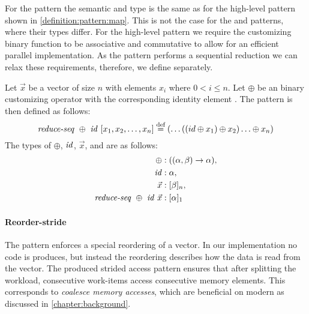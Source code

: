 For the \mapSeq pattern the semantic and type is the same as for the high-level \map pattern shown in \autoref{definition:pattern:map}.
This is not the case for the \reduceSeq and \reduce patterns, where their types differ.
For the high-level \reduce pattern we require the customizing binary function to be associative and commutative to allow for an efficient parallel implementation.
As the \reduceSeq pattern performs a sequential reduction we can relax these requirements, therefore, we define \reduceSeq separately.
\begin{definition}
  \label{definition:pattern:reduceSeq}
  Let $\vec{x}$ be a vector of size $n$ with elements $x_i$ where $0 < i \leq n$.
  Let $\oplus$ be an binary customizing operator with the corresponding identity element \id.
  The \reduceSeq pattern is then defined as follows:
  \begin{equation*}
    \text{\textit{reduce-seq}}\ \oplus\ \text{\textit{id}}\ [x_1, x_2, \dots, x_n]
      \stackrel{\textrm{\scriptsize def}}{=} (\dots((id \oplus x_1) \oplus x_2) \ldots \oplus x_n)
  \end{equation*}
  The types of $\oplus$, $\text{\textit{id}}$, $\vec{x}$, and \reduce are as follows:
  \begin{align*}
    \oplus &: ((\alpha, \beta) \rightarrow \alpha),\\
    \text{\textit{id}} &: \alpha,\\
    \vec{x} &: [\beta]_n,\\
    \text{\textit{reduce-seq}}\ \oplus\ \text{\textit{id}}\ \vec{x} &: [\alpha]_1
  \end{align*}
\end{definition}


\paragraph{Reorder-stride}
The \reorderStride pattern enforces a special reordering of a vector.
In our implementation no code is produces, but instead the reordering describes how the data is read from the vector.
The produced strided access pattern ensures that after splitting the workload, consecutive work-items access consecutive memory elements.
This corresponds to \emph{coalesce memory accesses}, which are beneficial on modern \GPUs as discussed in \autoref{chapter:background}.

